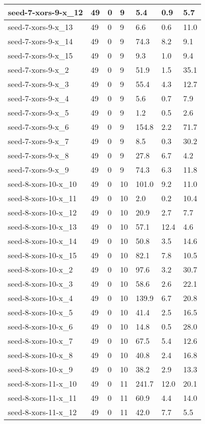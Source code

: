 \begin{scriptsize}
\begin{longtable}{|p{5cm}|l|l|l|l|l|l|}
seed-7-xors-9-x\_12&49&0&9&5.4&0.9&5.7 \\ \hline 
seed-7-xors-9-x\_13&49&0&9&6.6&0.6&11.0 \\ \hline 
seed-7-xors-9-x\_14&49&0&9&74.3&8.2&9.1 \\ \hline 
seed-7-xors-9-x\_15&49&0&9&9.3&1.0&9.4 \\ \hline 
seed-7-xors-9-x\_2&49&0&9&51.9&1.5&35.1 \\ \hline 
seed-7-xors-9-x\_3&49&0&9&55.4&4.3&12.7 \\ \hline 
seed-7-xors-9-x\_4&49&0&9&5.6&0.7&7.9 \\ \hline 
seed-7-xors-9-x\_5&49&0&9&1.2&0.5&2.6 \\ \hline 
seed-7-xors-9-x\_6&49&0&9&154.8&2.2&71.7 \\ \hline 
seed-7-xors-9-x\_7&49&0&9&8.5&0.3&30.2 \\ \hline 
seed-7-xors-9-x\_8&49&0&9&27.8&6.7&4.2 \\ \hline 
seed-7-xors-9-x\_9&49&0&9&74.3&6.3&11.8 \\ \hline 
seed-8-xors-10-x\_10&49&0&10&101.0&9.2&11.0 \\ \hline 
seed-8-xors-10-x\_11&49&0&10&2.0&0.2&10.4 \\ \hline 
seed-8-xors-10-x\_12&49&0&10&20.9&2.7&7.7 \\ \hline 
seed-8-xors-10-x\_13&49&0&10&57.1&12.4&4.6 \\ \hline 
seed-8-xors-10-x\_14&49&0&10&50.8&3.5&14.6 \\ \hline 
seed-8-xors-10-x\_15&49&0&10&82.1&7.8&10.5 \\ \hline 
seed-8-xors-10-x\_2&49&0&10&97.6&3.2&30.7 \\ \hline 
seed-8-xors-10-x\_3&49&0&10&58.6&2.6&22.1 \\ \hline 
seed-8-xors-10-x\_4&49&0&10&139.9&6.7&20.8 \\ \hline 
seed-8-xors-10-x\_5&49&0&10&41.4&2.5&16.5 \\ \hline 
seed-8-xors-10-x\_6&49&0&10&14.8&0.5&28.0 \\ \hline 
seed-8-xors-10-x\_7&49&0&10&67.5&5.4&12.6 \\ \hline 
seed-8-xors-10-x\_8&49&0&10&40.8&2.4&16.8 \\ \hline 
seed-8-xors-10-x\_9&49&0&10&38.2&2.9&13.3 \\ \hline 
seed-8-xors-11-x\_10&49&0&11&241.7&12.0&20.1 \\ \hline 
seed-8-xors-11-x\_11&49&0&11&60.9&4.4&14.0 \\ \hline 
seed-8-xors-11-x\_12&49&0&11&42.0&7.7&5.5 \\ \hline 

\end{longtable}
\end{scriptsize}
